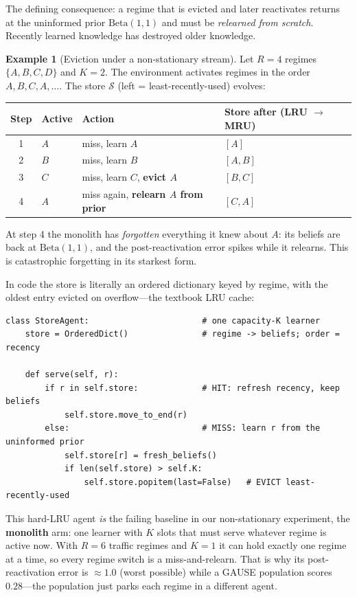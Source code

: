 \documentclass[11pt,a4paper]{article}
\theoremstyle{definition}
\newtheorem{example}{Example}[section]
\theoremstyle{plain}
\begin{document}
The defining consequence: a regime that is evicted and later reactivates returns
at the uninformed prior $\mathrm{Beta}(1,1)$ and must be \emph{relearned from
scratch}. Recently learned knowledge has destroyed older knowledge.

\begin{example}[Eviction under a non-stationary stream]
Let $R = 4$ regimes $\{A,B,C,D\}$ and $K = 2$. The environment activates regimes
in the order $A, B, C, A, \ldots$. The store $\mathcal{S}$ (left = least-recently-used) evolves:
\begin{center}
\begin{tabular}{clll}
\toprule
Step & Active & Action & Store after (LRU $\to$ MRU) \\
\midrule
1 & $A$ & miss, learn $A$ & $[A]$ \\
2 & $B$ & miss, learn $B$ & $[A, B]$ \\
3 & $C$ & miss, learn $C$, \textbf{evict $A$} & $[B, C]$ \\
4 & $A$ & miss again, \textbf{relearn $A$ from prior} & $[C, A]$ \\
\bottomrule
\end{tabular}
\end{center}
At step 4 the monolith has \emph{forgotten} everything it knew about $A$: its
beliefs are back at $\mathrm{Beta}(1,1)$, and the post-reactivation error spikes
while it relearns. This is catastrophic forgetting in its starkest form.
\end{example}

In code the store is literally an ordered dictionary keyed by regime, with the
oldest entry evicted on overflow---the textbook LRU cache:

\begin{lstlisting}
class StoreAgent:                       # one capacity-K learner
    store = OrderedDict()               # regime -> beliefs; order = recency

    def serve(self, r):
        if r in self.store:             # HIT: refresh recency, keep beliefs
            self.store.move_to_end(r)
        else:                           # MISS: learn r from the uninformed prior
            self.store[r] = fresh_beliefs()
            if len(self.store) > self.K:
                self.store.popitem(last=False)   # EVICT least-recently-used
\end{lstlisting}

\begin{keypoint}[title={In GAUSE}]
This hard-LRU agent \emph{is} the failing baseline in our non-stationary
experiment, the \textbf{monolith} arm: one learner with $K$ slots that must serve
whatever regime is active now. With $R = 6$ traffic regimes and $K = 1$ it can
hold exactly one regime at a time, so every regime switch is a miss-and-relearn.
That is why its post-reactivation error is $\approx 1.0$ (worst possible) while a
GAUSE population scores $0.28$---the population just parks each regime in a
different agent.
\end{keypoint}
\end{document}
